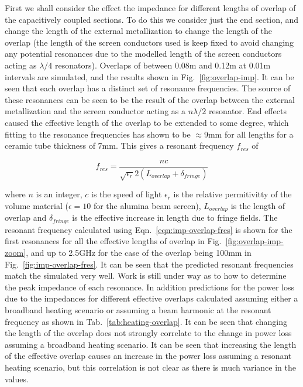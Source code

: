 First we shall consider the effect the impedance for different lengths of overlap of the capacitively coupled sections. To do this we consider just the end section, and change the length of the external metallization to change the length of the overlap (the length of the screen conductors used is keep fixed to avoid changing any potential resonances due to the modelled length of the screen conductors acting as $\lambda /4$ resonators). Overlaps of between 0.08m and 0.12m at 0.01m intervals are simulated, and the results shown in Fig.~\ref{fig:overlap-imp}. It can be seen that each overlap has a distinct set of resonance frequencies. The source of these resonances can be seen to be the result of the overlap between the external metallization and the screen conductor acting as a $n \lambda /2$ resonator. End effects caused the effective length of the overlap to be extended to some degree, which fitting to the resonance frequencies has shown to be $\approx 9$mm for all lengths for a ceramic tube thickness of 7mm. This gives a resonant frequency $f_{res}$ of

\begin{equation}
f_{res} = \frac{nc}{\sqrt{\epsilon_{r}}2 \left( L_{overlap} + \delta_{fringe} \right)}
\label{eqn:imp-overlap-fres}
\end{equation}

where $n$ is an integer, $c$ is the speed of light $\epsilon_{r}$ is the relative permitivitty of the volume material ($\epsilon=10$ for the alumina beam screen), $L_{overlap}$ is the length of overlap and $\delta_{fringe}$ is the effective increase in length due to fringe fields. The resonant frequency calculated using Eqn.~\ref{eqn:imp-overlap-fres} is shown for the first resonances for all the effective lengths of overlap in Fig.~\ref{fig:overlap-imp-zoom}, and up to 2.5GHz for the case of the overlap being 100mm in Fig.~\ref{fig:imp-overlap-fres}. It can be seen that the predicted resonant frequencies match the simulated very well. Work is still under way as to how to determine the peak impedance of each resonance. In addition predictions for the power loss due to the impedances for different effective overlaps calculated assuming either a broadband heating scenario or assuming a beam harmonic at the resonant frequency as shown in Tab.~\ref{tab:heating-overlap}. It can be seen that changing the length of the overlap does not strongly correlate to the change in power loss assuming a broadband heating scenario. It can be seen that increasing the length of the effective overlap causes an increase in the power loss assuming a resonant heating scenario, but this correlation is not clear as there is much variance in the values.

